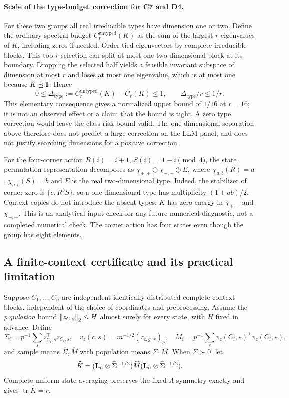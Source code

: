 \paragraph{Scale of the type-budget correction for C7 and D4.}
\label{sp:type-scale}
For these two groups all real irreducible types have dimension one or two. Define the ordinary spectral budget $C_r^{\mathrm{untyped}}(K)$ as the sum of the largest $r$ eigenvalues of $K$, including zeros if needed. Order tied eigenvectors by complete irreducible blocks. This top-$r$ selection can split at most one two-dimensional block at its boundary. Dropping the selected half yields a feasible invariant subspace of dimension at most $r$ and loses at most one eigenvalue, which is at most one because $K\preceq\mathbf{I}$. Hence
\[
 0\le \Delta_{\mathrm{type}}
 :=C_r^{\mathrm{untyped}}(K)-C_r(K)\le1,
 \qquad \Delta_{\mathrm{type}}/r\le1/r.
\]
This elementary consequence gives a normalized upper bound of $1/16$ at $r=16$; it is not an observed effect or a claim that the bound is tight. A zero type correction would leave the class-risk bound valid. The one-dimensional separation above therefore does not predict a large correction on the LLM panel, and does not justify searching dimensions for a positive correction.

For the four-corner action $R(i)=i+1$, $S(i)=1-i\pmod4$, the state permutation representation decomposes as $\chi_{+,+}\oplus\chi_{-,-}\oplus E$, where $\chi_{a,b}(R)=a$, $\chi_{a,b}(S)=b$ and $E$ is the real two-dimensional type. Indeed, the stabilizer of corner zero is $\{e,R^3S\}$, so a one-dimensional type has multiplicity $(1+ab)/2$. Context copies do not introduce the absent types: $K$ has zero energy in $\chi_{+,-}$ and $\chi_{-,+}$. This is an analytical input check for any future numerical diagnostic, not a completed numerical check. The corner action has four states even though the group has eight elements.

\subsection{A finite-context certificate and its practical limitation}
\label{sp:certificate}
Suppose $C_1,\ldots,C_n$ are independent identically distributed complete context blocks, independent of the choice of coordinates and preprocessing. Assume the \emph{population} bound $\left\lVert z_{C,s}\right\rVert_2\le H$ almost surely for every state, with $H$ fixed in advance. Define
\[
 \Sigma_i=p^{-1}\sum_sz_{C_i,s}^\top z_{C_i,s},\quad
 v_z(c,s)=m^{-1/2}(z_{c,g\cdot s})_g,\quad
 M_i=p^{-1}\sum_sv_z(C_i,s)^\top v_z(C_i,s),
\]
and sample means $\widehat\Sigma,\widehat M$ with population means $\Sigma,M$. When $\widehat\Sigma\succ0$, let
\[
 \widehat K=(\mathbf{I}_m\otimes\widehat\Sigma^{-1/2})\widehat M
                    (\mathbf{I}_m\otimes\widehat\Sigma^{-1/2}).
\]
Complete uniform state averaging preserves the fixed $\Lambda$ symmetry exactly and gives $\operatorname{tr}\widehat K=r$.

